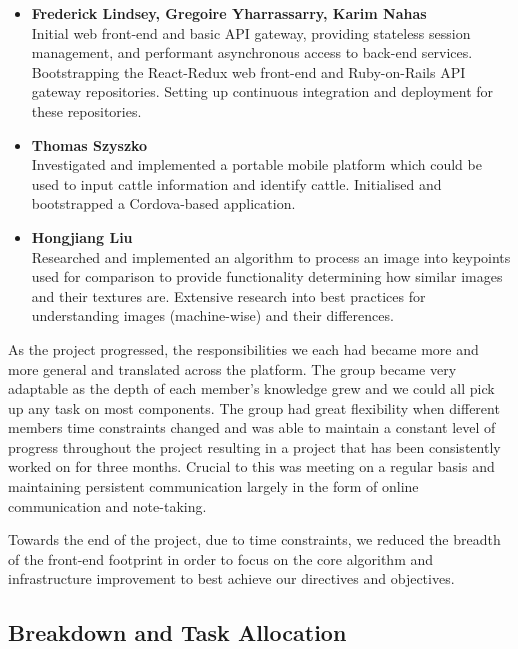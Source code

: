 \begin{itemize}
	\item	\textbf{Frederick Lindsey, Gregoire Yharrassarry, Karim Nahas} \\
		  	Initial web front-end and basic API gateway, providing stateless session management, and performant asynchronous access to back-end services. 
		  	Bootstrapping the React-Redux web front-end and Ruby-on-Rails API gateway repositories. Setting up continuous integration and deployment for these repositories.
	\item 	\textbf{Thomas Szyszko} \\
		  	Investigated and implemented a portable mobile platform which could be used to input cattle information and identify cattle.
		  	Initialised and bootstrapped a Cordova-based application.
	\item 	\textbf{Hongjiang Liu} \\
	 	  	Researched and implemented an algorithm to process an image into keypoints used for comparison to provide functionality determining how similar images and their textures are.
	 	  	Extensive research into best practices for understanding images (machine-wise) and their differences.
\end{itemize}

As the project progressed, the responsibilities we each had became more and more general and translated across the platform. The group became very adaptable as the depth of each member's knowledge grew and we could all pick up any task on most components. The group had great flexibility when different members time constraints changed and was able to maintain a constant level of progress throughout the project resulting in a project that has been consistently worked on for three months. Crucial to this was meeting on a regular basis and maintaining persistent communication largely in the form of online communication and note-taking.

Towards the end of the project, due to time constraints, we reduced the breadth of the front-end footprint in order to focus on the core algorithm and infrastructure improvement to best achieve our directives and objectives.


\subsection{Breakdown and Task Allocation}

